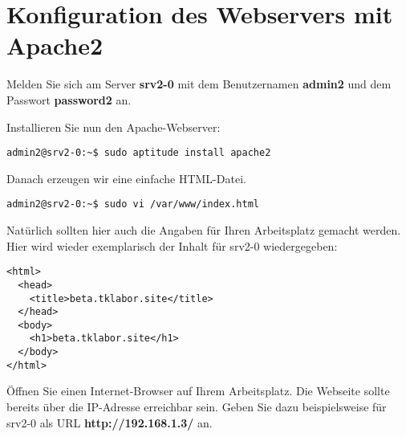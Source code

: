 \section{Konfiguration des Webservers mit Apache2}

Melden Sie sich am Server \textbf{srv2-0} mit dem Benutzernamen \textbf{admin2}
und dem Passwort \textbf{password2} an.

Installieren Sie nun den Apache-Webserver:
\begin{lstlisting}
admin2@srv2-0:~$ sudo aptitude install apache2
\end{lstlisting}

Danach erzeugen wir eine einfache HTML-Datei.
\begin{lstlisting}
admin2@srv2-0:~$ sudo vi /var/www/index.html
\end{lstlisting}
Natürlich sollten hier auch die Angaben für Ihren Arbeitsplatz gemacht werden. Hier wird wieder exemplarisch 
der Inhalt für srv2-0 wiedergegeben:
\begin{scriptsize}
\begin{lstlisting}
<html>
  <head>
    <title>beta.tklabor.site</title>
  </head>  
  <body>
    <h1>beta.tklabor.site</h1>
  </body>
</html>
\end{lstlisting}
\end{scriptsize}
Öffnen Sie einen Internet-Browser auf Ihrem Arbeitsplatz. Die Webseite sollte bereits über die IP-Adresse erreichbar sein. Geben Sie dazu
beispielsweise für srv2-0 als URL \textbf{http://192.168.1.3/} an.
